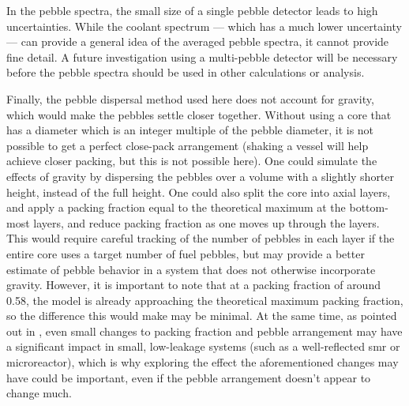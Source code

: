 In the pebble spectra, the small size of a single pebble detector leads to high uncertainties.  While the coolant spectrum --- which has a much lower uncertainty --- can provide a general idea of the averaged pebble spectra, it cannot provide fine detail.  A future investigation using a multi-pebble detector will be necessary before the pebble spectra should be used in other calculations or analysis.

Finally, the pebble dispersal method used here does not account for gravity, which would make the pebbles settle closer together.  Without using a core that has a diameter which is an integer multiple of the pebble diameter, it is not possible to get a perfect close-pack arrangement (shaking a vessel will help achieve closer packing, but this is not possible here).  One could simulate the effects of gravity by dispersing the pebbles over a volume with a slightly shorter height, instead of the full height.  One could also split the core into axial layers, and apply a packing fraction equal to the theoretical maximum at the bottom-most layers, and reduce packing fraction as one moves up through the layers.  This would require careful tracking of the number of pebbles in each layer if the entire core uses a target number of fuel pebbles, but may provide a better estimate of pebble behavior in a system that does not otherwise incorporate gravity.  However, it is important to note that at a packing fraction of around 0.58, the model is already approaching the theoretical maximum packing fraction, so the difference this would make may be minimal.  At the same time, as pointed out in \cite{karriem_mcnp_2001}, even small changes to packing fraction and pebble arrangement may have a significant impact in small, low-leakage systems (such as a well-reflected \acrshort{smr} or microreactor), which is why exploring the effect the aforementioned changes may have could be important, even if the pebble arrangement doesn't appear to change much.